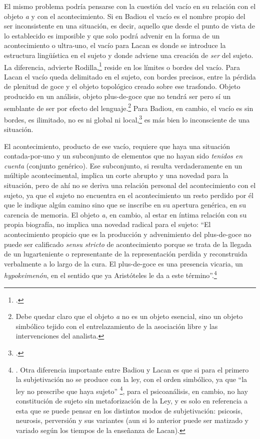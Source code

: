 El mismo problema podría pensarse con la cuestión del vacío en su relación con el objeto \emph{a} y con el acontecimiento. Si en Badiou el vacío es el nombre propio del ser inconsistente en una situación, es decir, aquello que desde el punto de vista de lo establecido es imposible y que solo podrá advenir en la forma de un acontecimiento o ultra-uno, el vacío para Lacan es donde se introduce la estructura lingüística en el sujeto y donde adviene una creación de \emph{ser} del sujeto. La diferencia, advierte Rodilla,\footcite[][330]{@7015-MARQUESRODILLA2007} reside en los límites o bordes del vacío. Para Lacan el vacío queda delimitado en el sujeto, con bordes precisos, entre la pérdida de plenitud de goce  y el objeto topológico creado sobre ese trasfondo. Objeto producido en un análisis, objeto plus-de-goce que no tendrá ser pero sí un semblante de ser por efecto del lenguaje.\footnote{Debe quedar claro que el objeto \emph{a} no es un objeto esencial, sino un objeto simbólico tejido con el entrelazamiento de la asociación libre y las intervenciones del analista.} Para Badiou, en cambio, el vacío es sin bordes, es ilimitado, no es ni global ni local,\footcite[][71]{@7130-BADIOU2007} es más bien lo inconsciente de una situación.

El acontecimiento, producto de ese vacío, requiere que haya una situación contada-por-uno y un subconjunto de elementos que no hayan sido \emph{tenidos en cuenta} (conjunto genérico). Ese subconjunto, si resulta verdaderamente en un múltiple acontecimental, implica un corte abrupto y una novedad para la situación, pero de ahí no se deriva una relación personal del acontecimiento con el sujeto, ya que el sujeto no encuentra en el acontecimiento un resto perdido por él que le indique algún camino sino que se inscribe en su apertura genérica, en su carencia de memoria. El objeto \emph{a}, en cambio, al estar en íntima relación con su propia biografía, no implica una novedad radical para el sujeto: \enquote{El acontecimiento propicio que es la producción y advenimiento del plus-de-goce no puede ser calificado \emph{sensu stricto} de acontecimiento porque se trata de la llegada de un lugarteniente o representante de la representación perdida y reconstruida verbalmente a lo largo de la cura. El plus-de-goce es una presencia vicaria, un \emph{hypokeimenón}, en el sentido que ya Aristóteles le da a este término}.\footnote{\cite[][331]{@7015-MARQUESRODILLA2007}. Otra diferencia importante entre Badiou y Lacan es que si para el primero la subjetivación no se produce con la ley, con el orden simbólico, ya que \enquote{la ley no prescribe que haya sujeto} \footcite[][331]{@7015-MARQUESRODILLA2007}, para el psicoanálisis, en cambio, no hay constitución de sujeto sin metaforización de la Ley, y es solo en referencia a esta que se puede pensar en los distintos modos de subjetivación: psicosis, neurosis, perversión y sus variantes (aun si lo anterior puede ser matizado y variado según los tiempos de la enseñanza de Lacan).}


